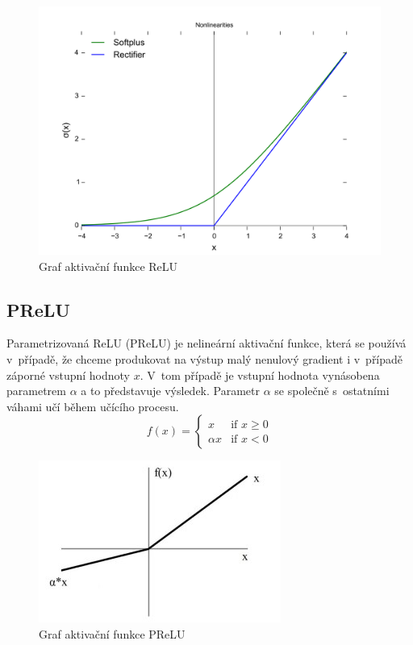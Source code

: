 \begin{figure}[H]
    \centering
    \includegraphics[scale=0.2]{obrazky-figures/ReLU.png}
    \caption{\label{fig:relu}Graf aktivační funkce ReLU}
\end{figure}




\subsection*{PReLU}
Parametrizovaná ReLU (PReLU)\cite{he2015delving} je nelineární aktivační funkce, která se používá v~případě, že chceme produkovat na výstup malý nenulový gradient i v~případě záporné vstupní hodnoty $x$. V~tom případě je vstupní hodnota vynásobena parametrem $\alpha$ a to představuje výsledek. Parametr $\alpha$ se společně s~ostatními váhami učí během učícího procesu.
\begin{equation}
  f(x) =
  \begin{cases}
    x & \text{if } x \geq 0 \\
    {\alpha}x & \text{if } x < 0
  \end{cases}
\end{equation}

\begin{figure}[H]
    \centering
    \includegraphics[scale=1.4]{obrazky-figures/prelu.jpg}
    \caption{\label{fig:prelu}Graf aktivační funkce PReLU}
\end{figure}


